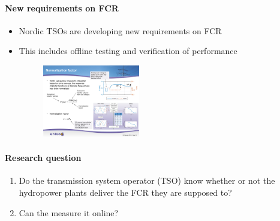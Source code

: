 \begin{frame}{\secname}
	\framesubtitle{New requirements on FCR}
	\begin{itemize}
		\item Nordic TSOs are developing new requirements on FCR
		\item This includes offline testing and verification of performance
		\begin{figure}
				\includegraphics[width=0.4\textwidth]{./pictures/fcr}
		\end{figure}
	\end{itemize}
\end{frame}
\begin{frame}{\secname}
	\framesubtitle{Research question}
	\begin{enumerate}
		\item<1-> Do the transmission system operator (TSO) know whether or not the hydropower plants deliver the FCR they are supposed to?
		\item<2-> Can the measure it online?
	\end{enumerate}
\end{frame}

